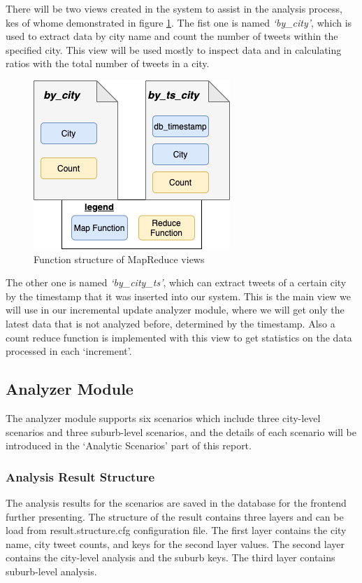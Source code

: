 \documentclass{article}
\begin{document}
There will be two views created in the system to assist in the analysis process, kes of whome demonstrated in figure \ref{fig:mapreduce}. The fist one is named \textit{‘by\_city’}, which is used to extract data by city name and count the number of tweets within the specified city. This view will be used mostly to inspect data and in calculating ratios with the total number of tweets in a city.
\begin{figure}[hbp]
\centering
\includegraphics{img/mapreduce.png}
\caption{Function structure of MapReduce views}
\label{fig:mapreduce}
\end{figure}

The other one is named \textit{‘by\_city\_ts’}, which can extract tweets of a certain city by the timestamp that it was inserted into our system. This is the main view we will use in our incremental update analyzer module, where we will get only the latest data that is not analyzed before, determined by the timestamp. Also a count reduce function is implemented with this view to get statistics on the data processed in each ‘increment’.

\subsection{Analyzer Module}
The analyzer module supports six scenarios which include three city-level scenarios and three suburb-level scenarios, and the details of each scenario will be introduced in the ‘Analytic Scenarios’ part of this report.
\subsubsection{Analysis Result Structure}
The analysis results for the scenarios are saved in the database for the frontend further presenting. The structure of the result contains three layers and can be load from result.structure.cfg configuration file. The first layer contains the city name, city tweet counts, and keys for the second layer values. The second layer contains the city-level analysis and the suburb keys. The third layer contains suburb-level analysis.
\end{document}
